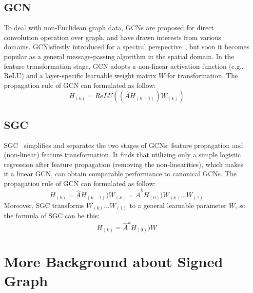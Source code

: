 \subsection{GCN}
To deal with non-Euclidean graph data, GCNs are proposed for direct convolution operation over graph, and have drawn interests from various domains. GCNisfirstly introduced for a spectral perspective~\cite{gcn}, but soon it becomes popular as a general message-passing algorithm in the spatial domain.
In the feature transformation stage, GCN adopts a non-linear activation function (e.g., ReLU) and a layer-specific learnable weight matrix \(W\) for transformation.
The propagation rule of GCN can formulated as follow:
\begin{equation}
    H_{(k)} = ReLU((\hat{A}H_{(k-1)})W_{(k)})
\end{equation}

\subsection{SGC}
SGC~\cite{sgc} simplifies and separates the two stages of GCNs: feature propagation and (non-linear) feature transformation. 
It finds that utilizing only a simple logistic regression after feature propagation (removing the non-linearities), which makes it a linear GCN, can obtain comparable performance to canonical GCNs. 
The propagation rule of GCN can formulated as follow:
\begin{equation}
    H_{(k)} = \hat{A}H_{(k-1)})W_{(k)}=\hat{A}^{k}H_{(0)})W_{(k)}...W_{(1)}
\end{equation}
Moreover, SGC transforms $W_{(k)}...W_{(1)}$ to a general learnable parameter $W$, so the formula of SGC can be this:
\begin{equation}
    H_{(k)} = \hat{A}^{k}H_{(0)})W
\end{equation}





\section{More Background about Signed Graph}
\label{app: signed graph}

